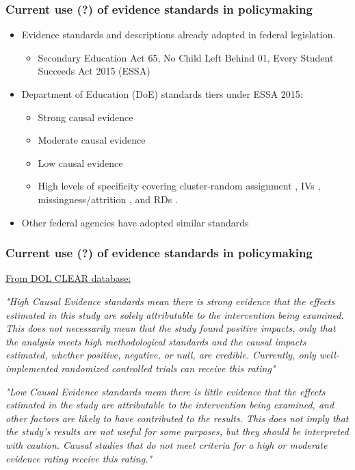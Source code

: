 \documentclass[usenames,dvipsnames]{beamer}
\begin{document}

\begin{frame}
\frametitle{Current use (?) of evidence standards in policymaking}

\begin{itemize}
\item Evidence standards and descriptions \textcolor{Cerulean}{already adopted in federal legislation}.
\begin{itemize}
\item Secondary Education Act 65, No Child Left Behind 01, Every Student Succeeds Act 2015 (ESSA)
\end{itemize}
\pause
\vspace{0.5cm}
\item \textcolor{Cerulean}{Department of Education (DoE) standards} tiers under ESSA 2015:
\begin{itemize}
\item Strong causal evidence
\item Moderate causal evidence
\item Low causal evidence
\item High levels of specificity covering cluster-random assignment \hyperlink{doe_cluster}{}, IVs \hyperlink{doe_iv}{}, missingness/attrition \hyperlink{doe_missing}{}, and RDs \hyperlink{doe_rd}{}. 
\end{itemize}
\pause
\item Other federal agencies have adopted similar standards \hyperlink{other_agencies}{}        
\end{itemize}

\end{frame}


\begin{frame}
\frametitle{Current use (?) of evidence standards in policymaking}
\scriptsize

\underline{From DOL CLEAR database:}

\textit{"\textcolor{Cerulean}{High Causal Evidence standards} mean there is strong evidence that the effects estimated in this study are solely attributable to the intervention being examined. This does not necessarily mean that the study found positive impacts, only that the analysis meets high methodological standards and the causal impacts estimated, whether positive, negative, or null, are credible. Currently, only \textcolor{Cerulean}{well-implemented randomized controlled trials} can receive this rating"}

\textit{"\textcolor{Cerulean}{Low Causal Evidence standards} mean there is little evidence that the effects estimated in the study are attributable to the intervention being examined, and other factors are likely to have contributed to the results. This does not imply that the study's results are not useful for some purposes, but they should be \textcolor{Cerulean}{interpreted with caution}. Causal studies that do not meet criteria for a high or moderate evidence rating receive this rating."}

\end{frame}
\end{document}
